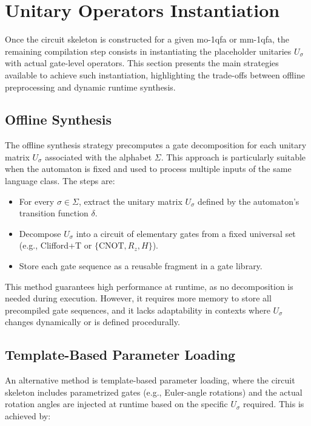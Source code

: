 \section{Unitary Operators Instantiation}
\label{sec:unitary-operators-instantiation}

Once the circuit skeleton is constructed for a given \gls{mo-1qfa} or \gls{mm-1qfa}, the remaining compilation step consists in instantiating the placeholder unitaries $U_{\sigma}$ with actual gate-level operators. This section presents the main strategies available to achieve such instantiation, highlighting the trade-offs between offline preprocessing and dynamic runtime synthesis.

\subsection{Offline Synthesis}

The offline synthesis strategy precomputes a gate decomposition for each unitary matrix $U_{\sigma}$ associated with the alphabet $\Sigma$. This approach is particularly suitable when the automaton is fixed and used to process multiple inputs of the same language class. The steps are:

\begin{itemize}
    \item For every $\sigma \in \Sigma$, extract the unitary matrix $U_{\sigma}$ defined by the automaton's transition function $\delta$.
    \item Decompose $U_{\sigma}$ into a circuit of elementary gates from a fixed universal set (e.g., Clifford+T or $\{\mathrm{CNOT}, R_z, H\}$).
    \item Store each gate sequence as a reusable fragment in a gate library.
\end{itemize}

This method guarantees high performance at runtime, as no decomposition is needed during execution. However, it requires more memory to store all precompiled gate sequences, and it lacks adaptability in contexts where $U_{\sigma}$ changes dynamically or is defined procedurally.

\subsection{Template-Based Parameter Loading}

An alternative method is template-based parameter loading, where the circuit skeleton includes parametrized gates (e.g., Euler-angle rotations) and the actual rotation angles are injected at runtime based on the specific $U_{\sigma}$ required. This is achieved by:


